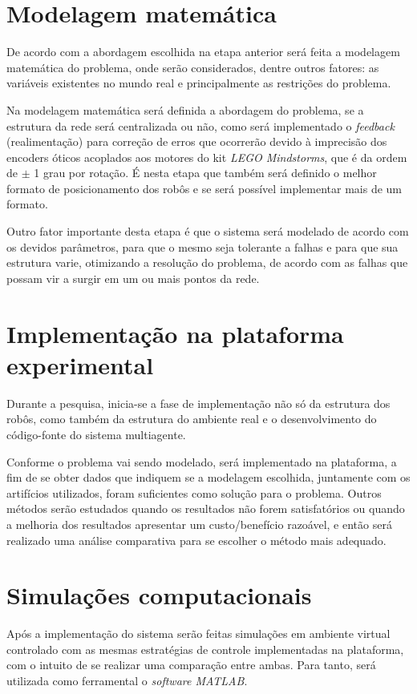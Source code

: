 \section{Modelagem matemática}

De acordo com a abordagem escolhida na etapa anterior será feita a modelagem matemática do problema, onde serão considerados, dentre outros fatores: as variáveis existentes no mundo real e principalmente as restrições do problema. 

Na modelagem matemática será definida a abordagem do problema, se a estrutura da rede será centralizada ou não, como será implementado o \emph{feedback} (realimentação) para correção de erros que ocorrerão devido à imprecisão dos encoders óticos acoplados aos motores do kit \emph{LEGO Mindstorms}, que é da ordem de $\pm$ 1 grau por rotação. %
É nesta etapa que também será definido o melhor formato de posicionamento dos robôs e se será possível implementar mais de um formato. 

Outro fator importante desta etapa é que o sistema será modelado de acordo com os devidos parâmetros, para que o mesmo seja tolerante a falhas e para que sua estrutura varie, otimizando a resolução do problema, de acordo com as falhas que possam vir a surgir em um ou mais pontos da rede.

\section{Implementação na plataforma experimental}
Durante a pesquisa, inicia-se a fase de implementação não só da estrutura dos robôs, como também da estrutura do ambiente real e o desenvolvimento do código-fonte do sistema multiagente. 

Conforme o problema vai sendo modelado, será implementado na plataforma, a fim de se obter dados que indiquem se a modelagem escolhida, juntamente com os artifícios utilizados, foram suficientes como solução para o problema. Outros métodos serão estudados quando os resultados não forem satisfatórios ou quando a melhoria dos resultados apresentar um custo/benefício razoável, e então será realizado uma análise comparativa para se escolher o método mais adequado.

\section{Simulações computacionais}

Após a implementação do sistema serão feitas simulações em ambiente virtual controlado com as mesmas estratégias de controle implementadas na plataforma, com o intuito de se realizar uma comparação entre ambas. Para tanto, será utilizada como ferramental o \emph{software MATLAB}.

